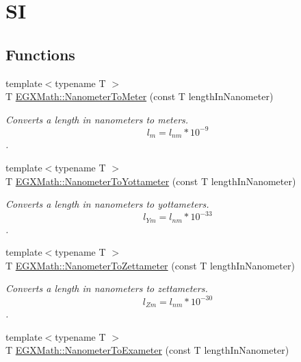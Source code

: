 \hypertarget{group___e_g_x_math-_conversions-_length_conversions-_s_i-_nanometer-_s_i}{}\section{SI}
\label{group___e_g_x_math-_conversions-_length_conversions-_s_i-_nanometer-_s_i}
\subsection*{Functions}
\begin{DoxyCompactItemize}
\item 
{\footnotesize template$<$typename T $>$ }\\T \mbox{\hyperlink{group___e_g_x_math-_conversions-_length_conversions-_s_i-_nanometer-_s_i_ga2ceddcda2954e4bb6cf1216ce4edc160}{E\+G\+X\+Math\+::\+Nanometer\+To\+Meter}} (const T length\+In\+Nanometer)
\begin{DoxyCompactList}\small\item\em Converts a length in nanometers to meters. \[ l_{m}=l_{nm} * 10^{-9} \]. \end{DoxyCompactList}\item 
{\footnotesize template$<$typename T $>$ }\\T \mbox{\hyperlink{group___e_g_x_math-_conversions-_length_conversions-_s_i-_nanometer-_s_i_ga986e80d7ab490fdc59ebbc2d7473bda3}{E\+G\+X\+Math\+::\+Nanometer\+To\+Yottameter}} (const T length\+In\+Nanometer)
\begin{DoxyCompactList}\small\item\em Converts a length in nanometers to yottameters. \[ l_{Ym}=l_{nm} * 10^{-33} \]. \end{DoxyCompactList}\item 
{\footnotesize template$<$typename T $>$ }\\T \mbox{\hyperlink{group___e_g_x_math-_conversions-_length_conversions-_s_i-_nanometer-_s_i_ga3306731dd581f22ad9203923e4a03d2a}{E\+G\+X\+Math\+::\+Nanometer\+To\+Zettameter}} (const T length\+In\+Nanometer)
\begin{DoxyCompactList}\small\item\em Converts a length in nanometers to zettameters. \[ l_{Zm}=l_{nm} * 10^{-30} \]. \end{DoxyCompactList}\item 
{\footnotesize template$<$typename T $>$ }\\T \mbox{\hyperlink{group___e_g_x_math-_conversions-_length_conversions-_s_i-_nanometer-_s_i_ga27316ac700548a2bcf058bb4f098f4e2}{E\+G\+X\+Math\+::\+Nanometer\+To\+Exameter}} (const T length\+In\+Nanometer)

\end{DoxyCompactItemize}
